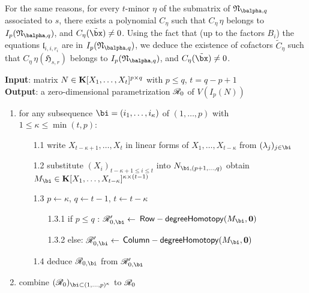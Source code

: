 \documentclass[12pt]{article}
\begin{document}
For the same reasons, for every $t$-minor $\eta$ of the submatrix of
$\mathfrak{N}_{\balpha,q}$ associated to $s$, there exists a polynomial
$C_\eta$ such that $C_\eta\, \eta$ belongs to
$I_p(\mathfrak{N}_{\balpha,q})$, and $C_\eta(\tilde\bx)\ne 0$. 
Using the
fact that (up to the factors $B_i$) the equations
$\mathfrak{l}_{i,i,r_i}$ are in $I_p(\mathfrak{N}_{\balpha,q})$, we deduce
the existence of cofactors $\tilde C_\eta$ such that $C_\eta\, \eta(\mathfrak{H}_{s,r})$
belongs to $I_p(\mathfrak{N}_{\balpha,q})$, and $C_\eta(\tilde\bx)\ne 0$.



\begin{algorithm}
\caption{$\mathsf{StartRow}$}
{\bf Input}: 
matrix $N \in \mathbf{K}[X_1, \ldots, X_t]^{p \times q}$ with $p \leq q$, $t = q-p+1$\\
{\bf Output}: a zero-dimensional parametrization $\mathscr{R}_0$ of $V(I_p(N))$
\begin{enumerate}
\item for any subsequence $\bi = (i_1, \ldots, i_\kappa)$ of $(1, \ldots, p)$ with $1 \leq \kappa \leq\min(t,p)$: 
\begin{enumerate}
\item[1.1] write $X_{t-\kappa+1}, \ldots, X_t$ in linear forms of $X_1, \ldots, X_{t-\kappa}$ from $(\lambda_j)_{j \in \bi}$%
\item[1.2] substitute $(X_i)_{t-\kappa+1 \leq i \leq t}$ into $N_{\bi,(p+1, \ldots, q)}$ obtain $M_{\bi} \in \KK[X_1, \ldots, X_{t-\kappa}]^{\kappa \times (t-1)}$
\item[1.3] $p \gets \kappa$, $q \gets t-1$, $t \gets t-\kappa$
\begin{enumerate}
\item[1.3.1] if $p \leq q$ : $\scrR_{0,\bi}' \gets$ $\mathsf{Row-degreeHomotopy}(M_{\bi},\mathbf{0})$
\item[1.3.2] else:  $\scrR_{0,\bi}' \gets$ $\mathsf{Column-degreeHomotopy}(M_{\bi},\mathbf{0})$
\end{enumerate}
\item[1.4] deduce $\scrR_{0,\bi}$ from $\scrR_{0,\bi}'$
\end{enumerate}
\item combine $(\scrR_0)_{{\bi} \subset (1, \ldots,p)^\kappa}$ to $\mathscr{R}_0$
\end{enumerate}
\label{Row}
\end{algorithm}



\end{document}
